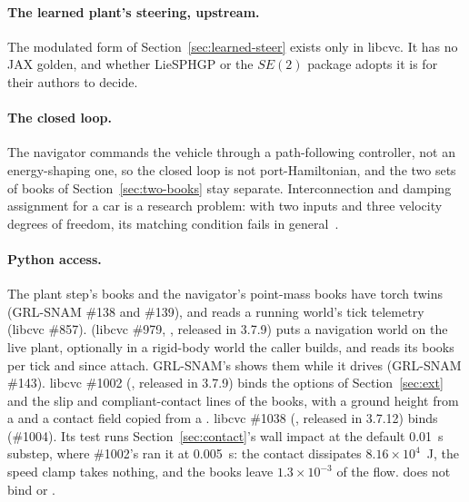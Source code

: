 \documentclass[11pt]{article}
\theoremstyle{remark}
\begin{document}
\paragraph{The learned plant's steering, upstream.} The modulated form of
Section~\ref{sec:learned-steer} exists only in libcvc. It has no JAX golden, and whether
LieSPHGP or the $SE(2)$ package adopts it is for their authors to decide.

\paragraph{The closed loop.} The navigator commands the vehicle through a path-following
controller, not an energy-shaping one, so the closed loop is not port-Hamiltonian, and the two
sets of books of Section~\ref{sec:two-books} stay separate. Interconnection and damping assignment for
a car is a research problem: with two inputs and three velocity degrees of freedom, its matching
condition fails in general~\cite{ortega2002idapbc}.

\paragraph{Python access.} The plant step's books and the navigator's point-mass books have torch
twins (GRL-SNAM \#138 and \#139), and  reads a running world's tick telemetry
(libcvc \#857).  (libcvc \#979, , released in 3.7.9)
puts a navigation world on the live plant, optionally in a rigid-body world
the caller builds, and reads its books per tick and since attach. GRL-SNAM's  shows
them while it drives (GRL-SNAM \#143). libcvc \#1002 (, released in 3.7.9) binds
the options of Section~\ref{sec:ext} and the slip and compliant-contact lines of the
books, with a ground height from a  and a contact field copied from a
. libcvc \#1038 (, released in 3.7.12) binds 
(\#1004). Its test runs Section~\ref{sec:contact}'s wall impact at the default 0.01~s substep,
where \#1002's ran it at 0.005~s: the contact dissipates $8.16\times10^{4}$~J, the speed clamp
takes nothing, and the books leave $1.3\times10^{-3}$ of the flow.
 does not bind  or .
\end{document}
